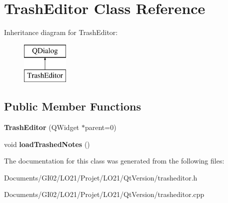 \hypertarget{class_trash_editor}{}\section{Trash\+Editor Class Reference}
\label{class_trash_editor}
Inheritance diagram for Trash\+Editor\+:\begin{figure}[H]
\begin{center}
\leavevmode
\includegraphics[height=2.000000cm]{class_trash_editor}
\end{center}
\end{figure}
\subsection*{Public Member Functions}
\begin{DoxyCompactItemize}
\item 
\mbox{\label{class_trash_editor_a7a106bef91b37afbc201c7742986bdb5}} 
{\bfseries Trash\+Editor} (Q\+Widget $\ast$parent=0)
\item 
\mbox{\label{class_trash_editor_adebdb1b69887257d460f66e3de2ae24a}} 
void {\bfseries load\+Trashed\+Notes} ()
\end{DoxyCompactItemize}


The documentation for this class was generated from the following files\+:\begin{DoxyCompactItemize}
\item 
Documents/\+G\+I02/\+L\+O21/\+Projet/\+L\+O21/\+Qt\+Version/trasheditor.\+h\item 
Documents/\+G\+I02/\+L\+O21/\+Projet/\+L\+O21/\+Qt\+Version/trasheditor.\+cpp\end{DoxyCompactItemize}
